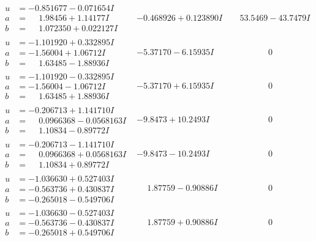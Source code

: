 \documentclass[1p]{elsarticle_modified}
\theoremstyle{definition}
\begin{document}
$$\begin{array}{c|c|c}
\begin{aligned}
u &= -0.851677 - 0.071654 I \\
a &= \phantom{-}1.98456 + 1.14177 I \\
b &= \phantom{-}1.072350 + 0.022127 I\end{aligned}
 & -0.468926 + 0.123890 I & \phantom{-}53.5469 - 43.7479 I \\ \hline\begin{aligned}
u &= -1.101920 + 0.332895 I \\
a &= -1.56004 + 1.06712 I \\
b &= \phantom{-}1.63485 - 1.88936 I\end{aligned}
 & -5.37170 - 6.15935 I & \phantom{-0.000000 } 0 \\ \hline\begin{aligned}
u &= -1.101920 - 0.332895 I \\
a &= -1.56004 - 1.06712 I \\
b &= \phantom{-}1.63485 + 1.88936 I\end{aligned}
 & -5.37170 + 6.15935 I & \phantom{-0.000000 } 0 \\ \hline\begin{aligned}
u &= -0.206713 + 1.141710 I \\
a &= \phantom{-}0.0966368 - 0.0568163 I \\
b &= \phantom{-}1.10834 - 0.89772 I\end{aligned}
 & -9.8473 + 10.2493 I & \phantom{-0.000000 } 0 \\ \hline\begin{aligned}
u &= -0.206713 - 1.141710 I \\
a &= \phantom{-}0.0966368 + 0.0568163 I \\
b &= \phantom{-}1.10834 + 0.89772 I\end{aligned}
 & -9.8473 - 10.2493 I & \phantom{-0.000000 } 0 \\ \hline\begin{aligned}
u &= -1.036630 + 0.527403 I \\
a &= -0.563736 + 0.430837 I \\
b &= -0.265018 - 0.549706 I\end{aligned}
 & \phantom{-}1.87759 - 0.90886 I & \phantom{-0.000000 } 0 \\ \hline\begin{aligned}
u &= -1.036630 - 0.527403 I \\
a &= -0.563736 - 0.430837 I \\
b &= -0.265018 + 0.549706 I\end{aligned}
 & \phantom{-}1.87759 + 0.90886 I & \phantom{-0.000000 } 0\\

\end{array}$$
\end{document}
